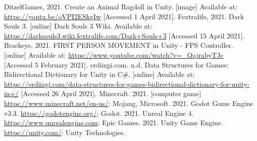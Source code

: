 \documentclass[11pt]{report}
\begin{document}
\begin{thebibliography}{}
    DitzelGames, 2021. Create an Animal Ragdoll in Unity. [image] Available at: \url{https://youtu.be/oVPI2ESkgIw} [Accessed 1 April 2021].
    Fextralife, 2021. Dark Souls 3. [online] Dark Souls 3 Wiki. Available at: \url{https://darksouls3.wiki.fextralife.com/Dark+Souls+3} [Accessed 15 April 2021]. 
    Brackeys. 2021. FIRST PERSON MOVEMENT in Unity - FPS Controller. [online] Available at: \url{https://www.youtube.com/watch?v=_QajrabyTJc} [Accessed 5 February 2021].
    erdiizgi.com. n.d. Data Structures for Games: Bidirectional Dictionary for Unity in C\#. [online] Available at: \url{https://erdiizgi.com/data-structures-for-games-bidirectional-dictionary-for-unity-in-c/} [Accessed 26 April 2021].
    Minecraft. 2021. [computer game] \url{https://www.minecraft.net/en-us/}: Mojang, Microsoft.
    2021. Godot Game Engine v3.3. \url{https://godotengine.org/}: Godot.
    2021. Unreal Engine 4. \url{https://www.unrealengine.com}: Epic Games.
    2021. Unity Game Engine. \url{https://unity.com/}: Unity Technologies.
\end{thebibliography}
\end{document}
